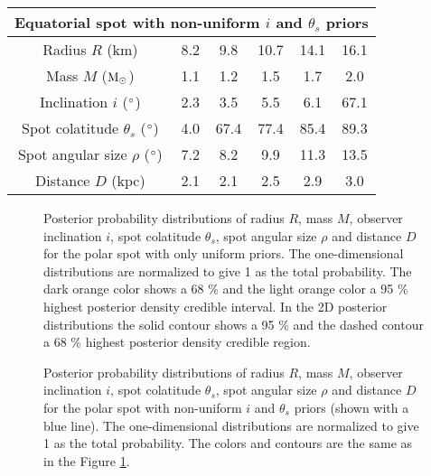 \documentclass{wihuri}
\def\msun{{\rm M_{\odot}}}
\def\thetas{\theta_{s}}
\begin{document}
\begin{center}
\begin{table}
\begin{center}
\begin{tabular}{| c | c | c | c | c | c |}
      \multicolumn{6}{c}{Equatorial spot with non-uniform $i$ and $\thetas$ priors} \\ \hline
      Radius $R$ (km) & 8.2 & 9.8 & 10.7 & 14.1 & 16.1  \\ \hline
      Mass $M$ ($\msun$) & 1.1 & 1.2 & 1.5 & 1.7 & 2.0  \\ \hline
      Inclination $i$ ($\degree$) & 2.3 & 3.5 & 5.5 & 6.1 & 67.1 \\ \hline
      Spot colatitude $\thetas$ ($\degree$) & 4.0 & 67.4 & 77.4 & 85.4 & 89.3 \\ \hline
      Spot angular size $\rho$ ($\degree$) & 7.2 & 8.2 & 9.9 & 11.3 & 13.5 \\ \hline
      Distance $D$ (kpc) & 2.1 & 2.1 & 2.5 & 2.9 & 3.0 \\ 


    \hline
  \end{tabular}
  \end{center} 

  \end{table}
\end{center} 




\begin{figure}
\centerline{}
\caption{Posterior probability distributions of radius $R$, mass $M$, observer inclination $i$, spot colatitude $\thetas$, spot angular size $\rho$ and distance $D$ for the polar spot with only uniform priors. The one-dimensional distributions are normalized to give 1 as the total probability. The dark orange color shows a 68 \% and the light orange color a 95 \% highest posterior density credible interval. In the 2D posterior distributions the solid contour shows a 95 \% and the dashed contour a 68 \% highest posterior density credible region.  
\label{fig:polpost}}
\end{figure}

\begin{figure}
\centerline{}
\caption{Posterior probability distributions of radius $R$, mass $M$, observer inclination $i$, spot colatitude $\thetas$, spot angular size $\rho$ and distance $D$ for the polar spot with non-uniform $i$ and $\thetas$ priors (shown with a blue line). The one-dimensional distributions are normalized to give 1 as the total probability. The colors and contours are the same as in the Figure \ref{fig:polpost}. 
\label{fig:polpostpr}}
\end{figure}
\end{document}
